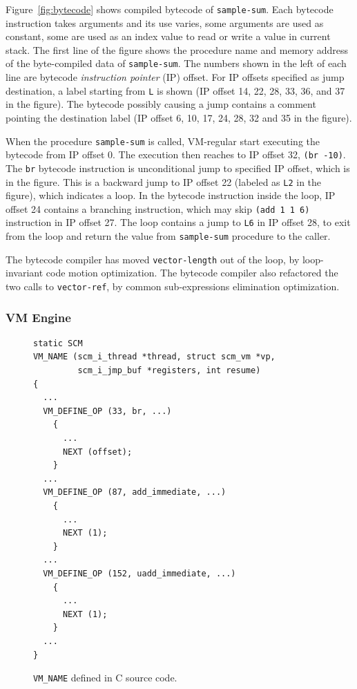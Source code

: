 \documentclass[preprint, 10pt]{sigplanconf}
\begin{document}
Figure~\hyperref[fig:bytecode]{\ref{fig:bytecode}} shows compiled bytecode of
\texttt{sample-sum}. Each bytecode instruction takes arguments and its use
varies, some arguments are used as constant, some are used as an index value to
read or write a value in current stack. The first line of the figure shows the
procedure name and memory address of the byte-compiled data of
\texttt{sample-sum}. The numbers shown in the left of each line are bytecode
\textit{instruction pointer} (IP) offset. For IP offsets specified as jump
destination, a label starting from \texttt{L} is shown (IP offset 14, 22, 28,
33, 36, and 37 in the figure). The bytecode possibly causing a jump contains a
comment pointing the destination label (IP offset 6, 10, 17, 24, 28, 32 and 35
in the figure).

When the procedure \texttt{sample-sum} is called, VM-regular start executing
the bytecode from IP offset 0. The execution then reaches to IP offset 32,
\texttt{(br -10)}. The \texttt{br} bytecode instruction is unconditional jump
to specified IP offset, which is  in the figure. This is a backward jump to
IP offset 22 (labeled as \texttt{L2} in the figure), which indicates a
loop. In the bytecode instruction inside the loop, IP offset 24 contains a
branching instruction, which may skip \texttt{(add 1 1 6)} instruction in IP
offset 27. The loop contains a jump to \texttt{L6} in IP offset 28, to exit
from the loop and return the value from \texttt{sample-sum} procedure to the
caller.

The bytecode compiler has moved \texttt{vector-length} out of the loop, by
loop-invariant code motion optimization. The bytecode compiler also refactored
the two calls to \texttt{vector-ref}, by common sub-expressions elimination
optimization.

\subsubsection{VM Engine}

\begin{figure}
  \centering
  \small
\begin{verbatim}
static SCM
VM_NAME (scm_i_thread *thread, struct scm_vm *vp,
         scm_i_jmp_buf *registers, int resume)
{
  ...
  VM_DEFINE_OP (33, br, ...)
    {
      ...
      NEXT (offset);
    }
  ...
  VM_DEFINE_OP (87, add_immediate, ...)
    {
      ...
      NEXT (1);
    }
  ...
  VM_DEFINE_OP (152, uadd_immediate, ...)
    {
      ...
      NEXT (1);
    }
  ...
}
\end{verbatim}
\caption{\texttt{VM\_NAME} defined in C source code.}
\label{fig:vmnameorig}
\end{figure}
\end{document}

